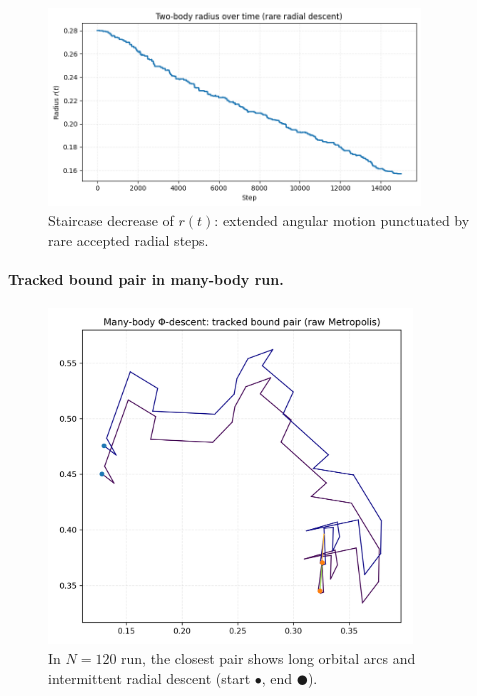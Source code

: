 \documentclass[aps,preprint,onecolumn,longbibliography,nofootinbib]{revtex4-2}
\numberwithin{equation}{section}        %
\begin{document}
\begin{figure}[H]
\centering
\includegraphics[width=0.88\textwidth]{figures/two_body_r_vs_t.png}
\caption{Staircase decrease of $r(t)$: extended angular motion punctuated by rare accepted radial steps.}
\label{fig:tworadius}
\end{figure}

\paragraph*{Tracked bound pair in many-body run.}
\begin{figure}[H]
\centering
\includegraphics[width=0.86\textwidth]{figures/orbit_many_body.png}
\caption{In $N{=}120$ run, the closest pair shows long orbital arcs and intermittent radial descent (start $\bullet$, end $\CIRCLE$).}
\label{fig:manypair}
\end{figure}

\end{document}
